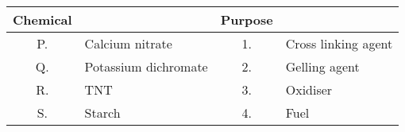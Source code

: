 \begin{tabular}[12pt]{ |c|l|c|l| } 
    \hline
    \textbf{Chemical} &  & \textbf{Purpose} &  \\ 
    \hline
    P. & Calcium nitrate & 1. & Cross linking agent \\ 
    \hline 
    Q. & Potassium dichromate & 2. & Gelling agent \\ 
    \hline
    R. & TNT & 3. & Oxidiser \\ 
    \hline   
    S. & Starch & 4. & Fuel \\ 
    \hline
\end{tabular}
